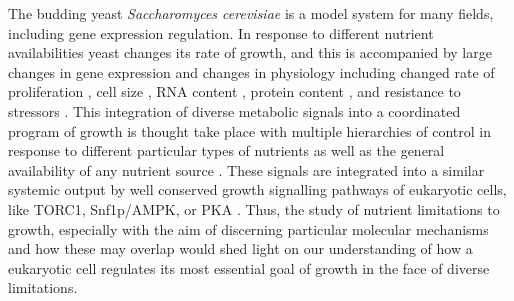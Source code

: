 The budding yeast \textit{Saccharomyces cerevisiae} is a
model system for many fields, including gene
expression regulation. In response to different nutrient 
availabilities yeast changes its rate of growth, and
this is accompanied by large changes in gene expression 
\parencite{brauer2008coordination,conway2012glucose}
and changes in physiology 
\parencite{waldron1977synthesis,carter1978protein}
including changed rate of proliferation \parencite{slator1918some}, 
cell size \parencite{jorgensen2004dynamic},
RNA content \parencite{waldron1975effect}, 
protein content \parencite{kief1981coordinate},
and resistance to stressors \parencite{elliott1993stress}.
This integration of diverse metabolic signals into a coordinated 
program of growth is thought take place with multiple hierarchies of 
control in response to different particular 
types of nutrients as well as the general availability of any 
nutrient source 
\parencite{winderickx2003feast,broach2012nutritional,cooper1982nitrogen}.
These signals are integrated into a similar systemic output by well conserved growth 
signalling pathways of eukaryotic cells, like TORC1, Snf1p/AMPK, 
or PKA \parencite{conrad2014nutrient,thevelein1994signal}.
Thus, the study of nutrient limitations to growth, especially with 
the aim of discerning particular molecular mechanisms and how these may overlap
\parencite{oliveira2015dynamic,oliveira2015inferring,tate2017general,stracka2014nitrogen,peli2015amino} 
would shed light on our understanding of how a eukaryotic cell 
regulates its most essential goal of growth 
in the face of diverse limitations.

